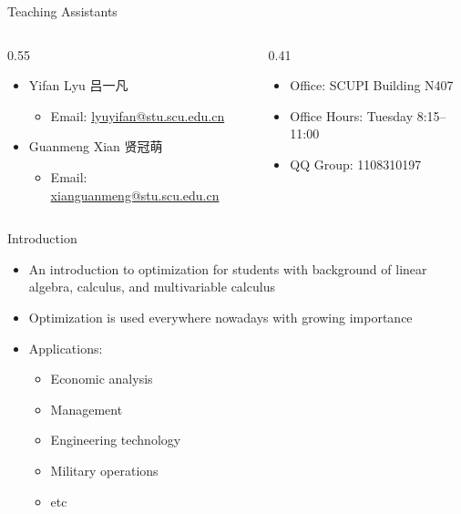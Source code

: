 \documentclass[aspectratio=169,hyperref,UTF8,CJK]{beamer}
\begin{document}
\begin{frame}{Teaching Assistants}
  \small
  \begin{columns}[T,onlytextwidth]
    \begin{column}{0.55\textwidth}
      \begin{itemize}
        \item Yifan Lyu 吕一凡
          \begin{itemize}
            \item Email: \url{lyuyifan@stu.scu.edu.cn}
          \end{itemize}
        \item Guanmeng Xian 贤冠萌
          \begin{itemize}
            \item Email: \url{xianguanmeng@stu.scu.edu.cn}
          \end{itemize}
      \end{itemize}
    \end{column}
    \begin{column}{0.41\textwidth}
      \begin{itemize}
        \item Office: SCUPI Building N407
        \item Office Hours: Tuesday 8:15--11:00
        \item QQ Group: 1108310197
      \end{itemize}
    \end{column}
  \end{columns}
\end{frame}

\begin{frame}{Introduction}
  \begin{itemize}
    \item An introduction to optimization for students with background of linear algebra, calculus, and multivariable calculus
    \item Optimization is used everywhere nowadays with growing importance
    \item Applications:
      \begin{itemize}
        \item Economic analysis
        \item Management
        \item Engineering technology
        \item Military operations
        \item etc
      \end{itemize}
  \end{itemize}
\end{frame}
\end{document}
